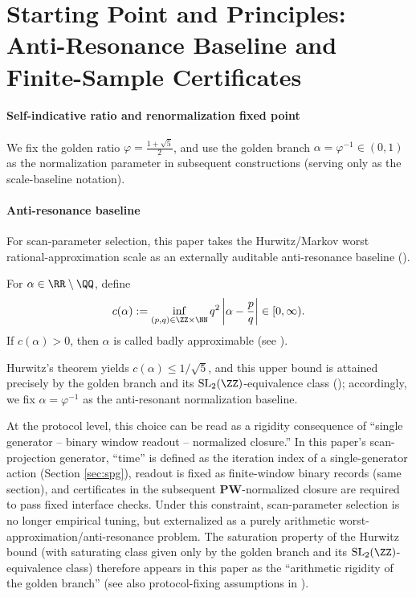 \section{Starting Point and Principles: Anti-Resonance Baseline and Finite-Sample Certificates}\label{sec:principles}

\paragraph{Self-indicative ratio and renormalization fixed point}

We fix the golden ratio \(\varphi=\frac{1+\sqrt5}{2}\), and use the golden branch \(\alpha=\varphi^{-1}\in(0,1)\) as the normalization parameter in subsequent constructions (serving only as the scale-baseline notation).

\paragraph{Anti-resonance baseline}

For scan-parameter selection, this paper takes the Hurwitz/Markov worst rational-approximation scale as an externally auditable anti-resonance baseline (\cite{Cassels1957,KuipersNiederreiter1974}).

\begin{definition}\label{def:markov-constant}
For \(\alpha\in\RR\setminus\QQ\), define
\[
c(\alpha):=\inf_{(p,q)\in\ZZ\times\NN} q^2\left|\alpha-\frac{p}{q}\right|\in[0,\infty).
\]
If \(c(\alpha)>0\), then \(\alpha\) is called badly approximable (see \cite{Cassels1957,KuipersNiederreiter1974}).
\end{definition}

Hurwitz's theorem yields \(c(\alpha)\le 1/\sqrt5\), and this upper bound is attained precisely by the golden branch and its \(\mathrm{SL}_2(\ZZ)\)-equivalence class (\cite{Cassels1957,KuipersNiederreiter1974}); accordingly, we fix \(\alpha=\varphi^{-1}\) as the anti-resonant normalization baseline.
\par
At the protocol level, this choice can be read as a rigidity consequence of ``single generator -- binary window readout -- normalized closure.'' In this paper's scan-projection generator, ``time'' is defined as the iteration index of a single-generator action (Section \ref{sec:spg}), readout is fixed as finite-window binary records (same section), and certificates in the subsequent \(\mathbf{PW}\)-normalized closure are required to pass fixed interface checks. Under this constraint, scan-parameter selection is no longer empirical tuning, but externalized as a purely arithmetic worst-approximation/anti-resonance problem. The saturation property of the Hurwitz bound (with saturating class given only by the golden branch and its \(\mathrm{SL}_2(\ZZ)\)-equivalence class) therefore appears in this paper as the ``arithmetic rigidity of the golden branch'' (see also protocol-fixing assumptions in \cite{Internal2026POMGenerativeAddressThreeRegisterBridgeRH}).


